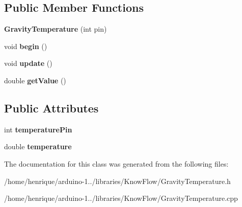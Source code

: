 \subsection*{Public Member Functions}
\begin{DoxyCompactItemize}
\item 
{\bfseries Gravity\+Temperature} (int pin)\hypertarget{class_gravity_temperature_a1156c03146096ebd11dfeb12d047b017}{}\label{class_gravity_temperature_a1156c03146096ebd11dfeb12d047b017}

\item 
void {\bfseries begin} ()\hypertarget{class_gravity_temperature_a4b0e6bba015c69a153a85cc8221dee2f}{}\label{class_gravity_temperature_a4b0e6bba015c69a153a85cc8221dee2f}

\item 
void {\bfseries update} ()\hypertarget{class_gravity_temperature_aa7a3463559fe46fa4471f779fb5ffdce}{}\label{class_gravity_temperature_aa7a3463559fe46fa4471f779fb5ffdce}

\item 
double {\bfseries get\+Value} ()\hypertarget{class_gravity_temperature_a7ee39e7ab5521f9dcbdea543c26c3a26}{}\label{class_gravity_temperature_a7ee39e7ab5521f9dcbdea543c26c3a26}

\end{DoxyCompactItemize}
\subsection*{Public Attributes}
\begin{DoxyCompactItemize}
\item 
int {\bfseries temperature\+Pin}\hypertarget{class_gravity_temperature_a12137835ad1ee47f2e5d940d74c02628}{}\label{class_gravity_temperature_a12137835ad1ee47f2e5d940d74c02628}

\item 
double {\bfseries temperature}\hypertarget{class_gravity_temperature_a6a4ea3f7581c3d3f18269492c7cc5c85}{}\label{class_gravity_temperature_a6a4ea3f7581c3d3f18269492c7cc5c85}

\end{DoxyCompactItemize}


The documentation for this class was generated from the following files\+:\begin{DoxyCompactItemize}
\item 
/home/henrique/arduino-\/1../libraries/\+Know\+Flow/Gravity\+Temperature.\+h\item 
/home/henrique/arduino-\/1../libraries/\+Know\+Flow/Gravity\+Temperature.\+cpp\end{DoxyCompactItemize}
